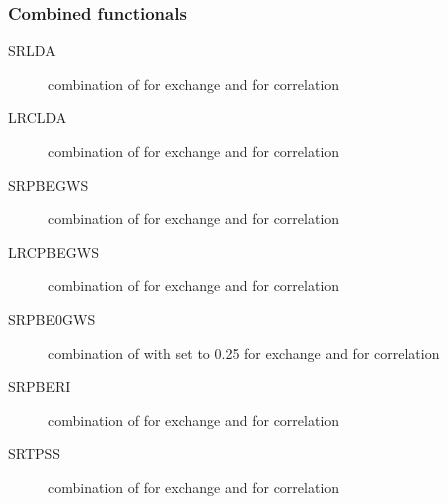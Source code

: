 \subsubsection{Combined functionals}
\providecommand\onefn[1]{#1}
\begin{description}

\item[SRLDA] combination of  for exchange and  for correlation~\cite{srdft:LDAERF}

\item[LRCLDA] combination of  for exchange and  for correlation~\cite{srdft:LDAERF}

\item[SRPBEGWS] combination of  for exchange and  for correlation~\cite{srdft:PBEGWSa,srdft:PBEGWSb}

\item[LRCPBEGWS] combination of  for exchange and  for correlation~\cite{srdft:PBEGWSa,srdft:PBEGWSb}

\item[SRPBE0GWS] combination of  with  set to 0.25 for exchange and  for correlation~\cite{srdft:PBEGWSa,srdft:PBEGWSb}

\item[SRPBERI] combination of  for exchange and  for correlation~\cite{srdft:erfgau,srdft:Heyd2004}

\item[SRTPSS] combination of  for exchange and  for correlation~\cite{srdft:srTPSS}

\end{description}

